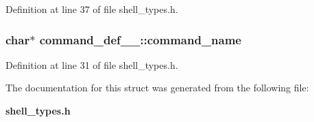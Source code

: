 Definition at line 37 of file shell\_\-types.h.
\subsubsection[{command\_\-name}]{\setlength{\rightskip}{0pt plus 5cm}char$\ast$ {\bf command\_\-def\_\-\_\-::command\_\-name}}\label{structcommand__def_____a6470cd228728d90e6d137beb7b1e7b1a}


Definition at line 31 of file shell\_\-types.h.

The documentation for this struct was generated from the following file:\begin{DoxyCompactItemize}
\item 
{\bf shell\_\-types.h}\end{DoxyCompactItemize}
